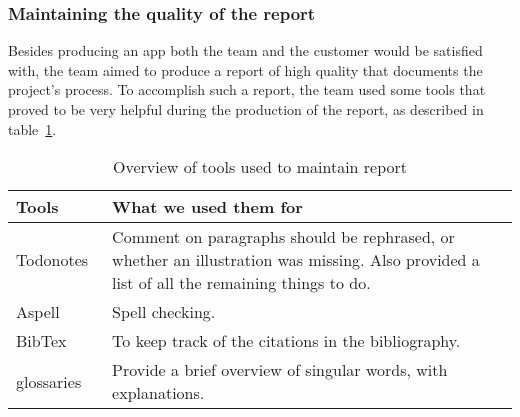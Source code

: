 \subsubsection{Maintaining the quality of the report}
Besides producing an app both the team and the customer would be satisfied with, the team aimed to produce a report of high quality that documents the project's process. To accomplish such a report, the team used some tools that proved to be very helpful during the production of the report, as described in table~\ref{tab:reportTools}.

\begin{table}[H]
\begin{tabular}{|l|p{13cm}|}
\hline
\textbf{Tools} & \textbf{What we used them for}\\\hline
Todonotes~\cite{todo}&Comment on paragraphs should be rephrased, or whether an illustration was missing. Also provided a list of all the remaining things to do.\\\hline
Aspell~\cite{aspell} & Spell checking.\\\hline
BibTex~\cite{bibtex}&To keep track of the citations in the bibliography.\\\hline
glossaries~\cite{glossaries}& Provide a brief overview of singular words, with explanations.\\\hline
\end{tabular}
\caption{Overview of tools used to maintain report}
\label{tab:reportTools}
\end{table}

\begin{comment}
\subsubsection{\textbackslash todonotes}
Feedback is key when creating a product. The \textbackslash todonotes~\cite{todo} package allowed the team to comment on paragraphs and formulations we wanted to rephrase, whether an illustration was missing, and also gave us a list of all the things we had to do, making it easy to get an overview of the remaining tasks regarding the report.\\

\subsubsection{Spell checking: aspell}
Although manual proofreading cannot be avoided, it is advantageous to have a tool to perform automatic spell checking. Aspell~\cite{aspell} is such a tool.\\

\subsubsection{References and glossary}
To keep track of the citations in the bibliography in the report, we used a LaTeX-package called BibTex~\cite{bibtex}, and for our glossaries, a package called glossaries~\cite{glossaries}.

\end{comment}
